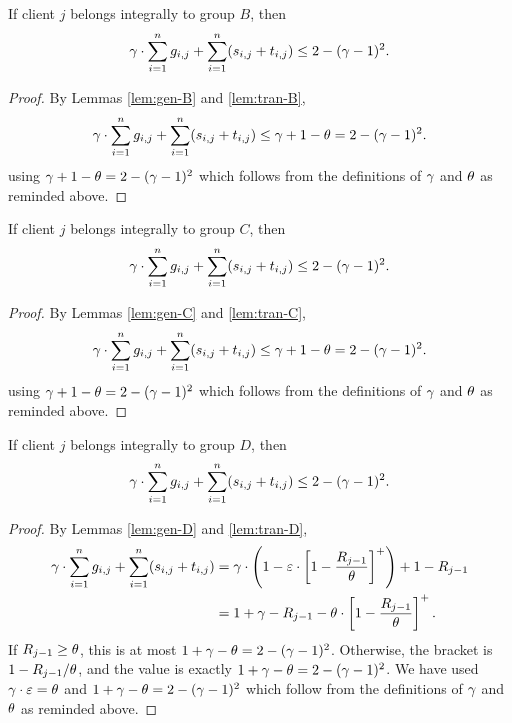 \begin{lemma}
    \label{lem:budget-B}
    If client $j$ belongs integrally to group $B$, then
    \begin{equation*}
        \gamma \cdot \sum_{i=1}^n g_{i,j} + \sum_{i=1}^n (s_{i,j} + t_{i,j}) \leq 2-(\gamma-1)^2.
    \end{equation*}
\end{lemma}
\begin{proof}
    By Lemmas \ref{lem:gen-B} and \ref{lem:tran-B},
    \begin{equation*}
        \gamma \cdot \sum_{i=1}^n g_{i,j} + \sum_{i=1}^n (s_{i,j} + t_{i,j}) \le \gamma + 1-\theta = 2-(\gamma-1)^2.
    \end{equation*}
    using $\gamma + 1-\theta = 2-(\gamma-1)^2$ which follows from the definitions of $\gamma$ and $\theta$ as reminded above.
\end{proof}

\begin{lemma}
    \label{lem:budget-C}
    If client $j$ belongs integrally to group $C$, then
    \begin{equation*}
        \gamma \cdot \sum_{i=1}^n g_{i,j} + \sum_{i=1}^n (s_{i,j} + t_{i,j}) \leq 2-(\gamma-1)^2.
    \end{equation*}
\end{lemma}
\begin{proof}
    By Lemmas \ref{lem:gen-C} and \ref{lem:tran-C},
    \begin{equation*}
        \gamma \cdot \sum_{i=1}^n g_{i,j} + \sum_{i=1}^n (s_{i,j} + t_{i,j}) \le \gamma + 1-\theta = 2-(\gamma-1)^2.
    \end{equation*}
    using $\gamma + 1-\theta = 2-(\gamma-1)^2$ which follows from the definitions of $\gamma$ and $\theta$ as reminded above.
\end{proof}

\begin{lemma}
    \label{lem:budget-D}
    If client $j$ belongs integrally to group $D$, then
    \begin{equation*}
        \gamma \cdot \sum_{i=1}^n g_{i,j} + \sum_{i=1}^n (s_{i,j} + t_{i,j}) \leq 2-(\gamma-1)^2.
    \end{equation*}
\end{lemma}
\begin{proof}
    By Lemmas \ref{lem:gen-D} and \ref{lem:tran-D},
    \begin{align*}
        \gamma \cdot \sum_{i=1}^n g_{i,j} + \sum_{i=1}^n (s_{i,j} + t_{i,j})
        &= \gamma \cdot \left(1 - \varepsilon \cdot \left[1 - \frac{R_{j-1}}{\theta}\right]^+\right) + 1 - R_{j-1} \\
        &= 1+\gamma - R_{j-1} - \theta \cdot \left[1 - \frac{R_{j-1}}{\theta}\right]^+.
    \end{align*}
    If $R_{j-1} \ge \theta$, this is at most $1+\gamma-\theta = 2-(\gamma-1)^2$.
    Otherwise, the bracket is $1-R_{j-1}/\theta$, and the value is exactly $1+\gamma-\theta = 2-(\gamma-1)^2$.
    We have used $\gamma \cdot \varepsilon = \theta$ and $1+\gamma - \theta = 2-(\gamma-1)^2$ which follow from the definitions of $\gamma$ and $\theta$ as reminded above.
\end{proof}

